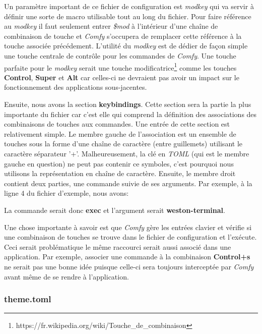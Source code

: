 \documentclass[titlepage]{article}
\begin{document}
\par
Un paramètre important de ce fichier de configuration est \textit{modkey}
qui va servir à définir une sorte de macro utilisable tout au long
du fichier. Pour faire référence au \textit{modkey} il faut seulement entrer
\textit{\$mod} à l'intérieur d'une chaîne de combinaison de touche et \textit{Comfy} s'occupera de remplacer cette référence à la touche associée précédement.
L'utilité du \textit{modkey} est de dédier de façon simple une touche centrale
de contrôle pour les commandes de \textit{Comfy}. Une touche parfaite pour le \textit{modkey}
serait une touche
modificatrice\footnote{https://fr.wikipedia.org/wiki/Touche\_de\_combinaison}
comme les touches \textbf{Control}, \textbf{Super} et \textbf{Alt} car
celles-ci ne devraient pas avoir un impact sur le fonctionnement des
applications sous-jacentes.
\par
\bigskip
Ensuite, nous avons la section \textbf{keybindings}. Cette section sera la
partie la plus importante du fichier car c'est elle qui
comprend la définition des associations des combinaisons de touches aux commandes. Une entrée de cette
section est relativement simple. Le membre gauche de l'association est un ensemble
de touches sous la forme d'une chaîne de caractère (entre guillemets) utilisant le caractère séparateur '+'. Malheureusement, la clé en \textit{TOML} (qui est
le membre gauche en question) ne peut pas contenir ce symboles, c'est
pourquoi nous utilisons la représentation en chaîne de caractère. Ensuite, le membre droit contient deux
parties, une commande suivie de ses arguments. Par exemple, à la ligne 4 du fichier d'exemple, nous avons:



La commande serait donc \textbf{exec} et l'argument serait
\textbf{weston-terminal}.

\par
\bigskip
Une chose importante à savoir est que \textit{Comfy} gère les entrées clavier
et vérifie si une combinaison de touches se trouve dans le fichier de
configuration et l'exécute. Ceci serait problématique le même raccourci serait
aussi associé dans une application. Par exemple, associer une commande à la
combinaison \textbf{Control+s} ne serait pas une bonne idée puisque celle-ci
sera toujours interceptée par \textit{Comfy} avant même de se rendre à
l'application.

\subsubsection{theme.toml}
\begin{minipage}{\linewidth}
	
\end{minipage}
\end{document}

